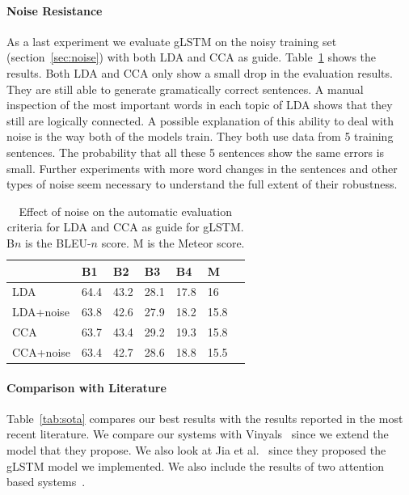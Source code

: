 \documentclass[twoside,twocolumn]{article}
\begin{document}
	\paragraph{Noise Resistance}
	As a last experiment we evaluate gLSTM on the noisy training set (section~\ref{sec:noise}) with both LDA and CCA as guide.
	Table~\ref{table:noisy} shows the results. Both LDA and CCA only show a small drop in the evaluation results. They are still able to generate gramatically correct sentences. A manual inspection of the most important words in each topic of LDA shows that they still are logically connected. A possible explanation of this ability to deal with noise is the way both of the models train. They both use data from 5 training sentences. The probability that all these 5 sentences show the same errors is small. Further experiments with more word changes in the sentences and other types of noise seem necessary to understand the full extent of their robustness.
	
	\begin{table}
		\centering
		\begin{tabular}{lllllll}
			~                  & B1 & B2 & B3 & B4 & M \\ \hline
			LDA   & 64.4   & 43.2   & 28.1   & 17.8 & 16 \\
			LDA+noise   & 63.8   & 42.6   & 27.9   & 18.2 & 15.8\\ \hline
			CCA   & 63.7   & 43.4   & 29.2   & 19.3 & 15.8 \\
			CCA+noise   & 63.4  & 42.7   & 28.6   & 18.8 & 15.5 \\ \hline			
		\end{tabular}
		\caption{Effect of noise on the automatic evaluation criteria for LDA and CCA as guide for gLSTM. B$n$ is the BLEU-$n$ score. M is the Meteor score.}
		\label{table:noisy}
	\end{table}
	
	
	
	\paragraph{Comparison with Literature}
	Table~\ref{tab:sota} compares our best results with the results reported in the most recent literature. We compare our systems with Vinyals~\cite{Google} since we extend the model that they propose. We also look at Jia et al.~\cite{Fernando2015} since they proposed the gLSTM model we implemented. We also include the results of two attention based systems~\cite{Jin2015, Xu2015}. 
	
\end{document}
